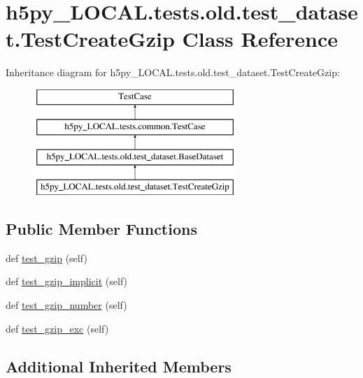 \hypertarget{classh5py__LOCAL_1_1tests_1_1old_1_1test__dataset_1_1TestCreateGzip}{}\section{h5py\+\_\+\+L\+O\+C\+A\+L.\+tests.\+old.\+test\+\_\+dataset.\+Test\+Create\+Gzip Class Reference}
\label{classh5py__LOCAL_1_1tests_1_1old_1_1test__dataset_1_1TestCreateGzip}
Inheritance diagram for h5py\+\_\+\+L\+O\+C\+A\+L.\+tests.\+old.\+test\+\_\+dataset.\+Test\+Create\+Gzip\+:\begin{figure}[H]
\begin{center}
\leavevmode
\includegraphics[height=4.000000cm]{classh5py__LOCAL_1_1tests_1_1old_1_1test__dataset_1_1TestCreateGzip}
\end{center}
\end{figure}
\subsection*{Public Member Functions}
\begin{DoxyCompactItemize}
\item 
def \hyperlink{classh5py__LOCAL_1_1tests_1_1old_1_1test__dataset_1_1TestCreateGzip_a1cb51183c7141ec825abbad47dcc60e7}{test\+\_\+gzip} (self)
\item 
def \hyperlink{classh5py__LOCAL_1_1tests_1_1old_1_1test__dataset_1_1TestCreateGzip_a60457c876a23330891fce9fb8c9e4032}{test\+\_\+gzip\+\_\+implicit} (self)
\item 
def \hyperlink{classh5py__LOCAL_1_1tests_1_1old_1_1test__dataset_1_1TestCreateGzip_a16a65fbf8d47f53dc6310d4070e29bc7}{test\+\_\+gzip\+\_\+number} (self)
\item 
def \hyperlink{classh5py__LOCAL_1_1tests_1_1old_1_1test__dataset_1_1TestCreateGzip_a6b8567c8befcc6a7bd2f2e063da08a6f}{test\+\_\+gzip\+\_\+exc} (self)
\end{DoxyCompactItemize}
\subsection*{Additional Inherited Members}


